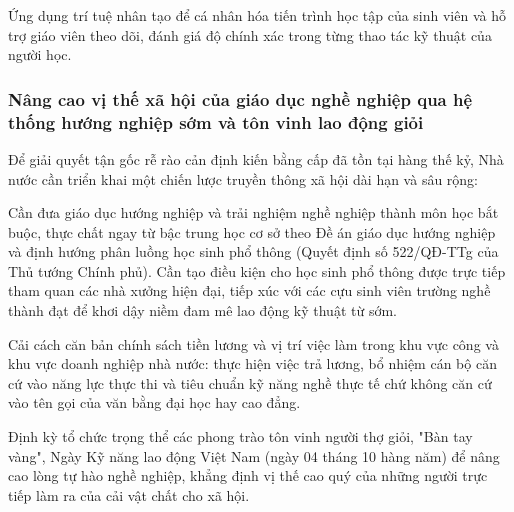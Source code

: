 Ứng dụng trí tuệ nhân tạo để cá nhân hóa tiến trình học tập của sinh viên và hỗ trợ giáo viên theo dõi, đánh giá độ chính xác trong từng thao tác kỹ thuật của người học.

\subsubsection{Nâng cao vị thế xã hội của giáo dục nghề nghiệp qua hệ thống hướng nghiệp sớm và tôn vinh lao động giỏi}

Để giải quyết tận gốc rễ rào cản định kiến bằng cấp đã tồn tại hàng thế kỷ, Nhà nước cần triển khai một chiến lược truyền thông xã hội dài hạn và sâu rộng:

Cần đưa giáo dục hướng nghiệp và trải nghiệm nghề nghiệp thành môn học bắt buộc, thực chất ngay từ bậc trung học cơ sở theo Đề án giáo dục hướng nghiệp và định hướng phân luồng học sinh phổ thông (Quyết định số 522/QĐ-TTg của Thủ tướng Chính phủ). Cần tạo điều kiện cho học sinh phổ thông được trực tiếp tham quan các nhà xưởng hiện đại, tiếp xúc với các cựu sinh viên trường nghề thành đạt để khơi dậy niềm đam mê lao động kỹ thuật từ sớm.

Cải cách căn bản chính sách tiền lương và vị trí việc làm trong khu vực công và khu vực doanh nghiệp nhà nước: thực hiện việc trả lương, bổ nhiệm cán bộ căn cứ vào năng lực thực thi và tiêu chuẩn kỹ năng nghề thực tế chứ không căn cứ vào tên gọi của văn bằng đại học hay cao đẳng.

Định kỳ tổ chức trọng thể các phong trào tôn vinh người thợ giỏi, "Bàn tay vàng", Ngày Kỹ năng lao động Việt Nam (ngày 04 tháng 10 hàng năm) để nâng cao lòng tự hào nghề nghiệp, khẳng định vị thế cao quý của những người trực tiếp làm ra của cải vật chất cho xã hội.
